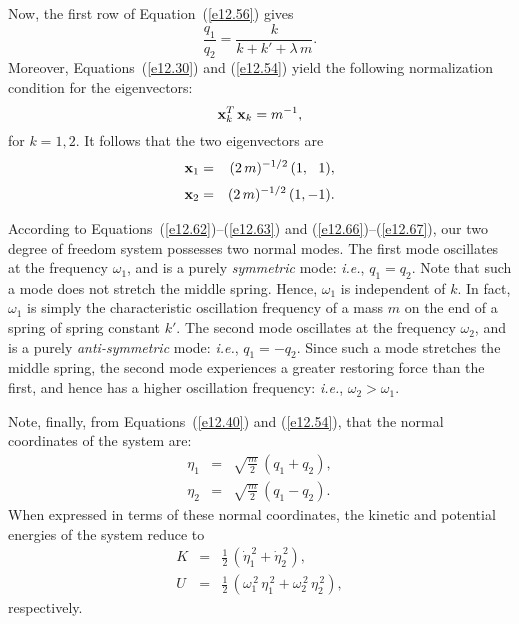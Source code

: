 Now, the first row of Equation~(\ref{e12.56}) gives
\begin{equation}
\frac{q_1}{q_2}= \frac{k}{k+k'+\lambda\,m}.
\end{equation}
Moreover, Equations~(\ref{e12.30}) and (\ref{e12.54}) yield the following
normalization condition for the eigenvectors:
\begin{equation}
{\bf x}_k^T\,{\bf x}_k = m^{-1},
\end{equation}
for $k=1,2$.  It follows that the two eigenvectors are
\begin{eqnarray}\label{e12.66}
{\bf x}_1 &=& (2\,m)^{-1/2}\,(1,\,\,\,\, 1),\\[0.5ex]
{\bf x}_2 &=& (2\,m)^{-1/2}\,(1,-1).\label{e12.67}
\end{eqnarray}

According to Equations~(\ref{e12.62})--(\ref{e12.63}) and (\ref{e12.66})--(\ref{e12.67}), our two degree of freedom system possesses two normal modes. The first mode oscillates at the frequency $\omega_1$, and is a purely {\em symmetric}\/
mode: {\em i.e.}, $q_1 = q_2$. Note that such a mode does not stretch
the middle spring. Hence, $\omega_1$ is independent of $k$. In fact, $\omega_1$ is simply the characteristic oscillation frequency of a mass $m$ on the end of a spring of spring constant $k'$. The second mode
oscillates at the frequency $\omega_2$, and is a purely
{\em anti-symmetric}\/ mode: {\em i.e.}, $q_1=-q_2$. Since such a mode
stretches the middle spring, the second mode experiences a greater restoring force than the first, and hence has a higher oscillation frequency: {\em i.e.},
$\omega_2> \omega_1$. 

Note, finally, from Equations~(\ref{e12.40}) and (\ref{e12.54}), that the normal
coordinates of the system are:
\begin{eqnarray}
\eta_1 &=& \sqrt{\frac{m}{2}}\,(q_1 + q_2),\\[0.5ex]
\eta_2 &=& \sqrt{\frac{m}{2}}\,(q_1-q_2).
\end{eqnarray}
When expressed in terms of these normal coordinates, the kinetic
and potential energies of the system reduce to
\begin{eqnarray}
K &=& \frac{1}{2}\,(\dot{\eta}_1^{\,2} + \dot{\eta}_2^{\,2}),\\[0.5ex]
U &=&\frac{1}{2}\,(\omega_1^{\,2}\,\eta_1^{\,2} + \omega_2^{\,2}\,\eta_2^{\,2}),
\end{eqnarray}
respectively.


